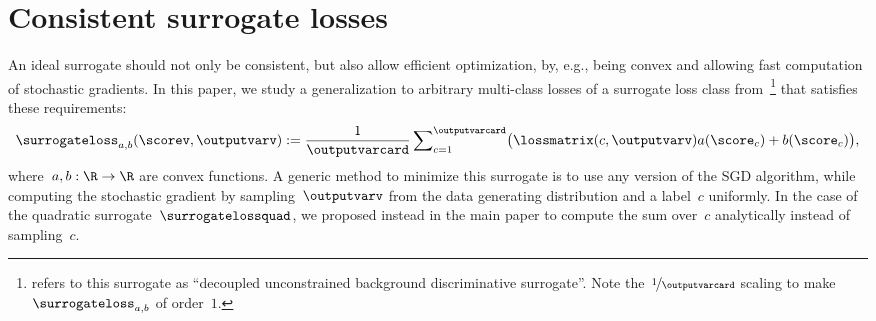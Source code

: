 \documentclass{article}
\begin{document}
\section{Consistent surrogate losses}
\label{sec:specialLosses}
An ideal surrogate should not only be consistent, but also allow efficient optimization, by, e.g., being convex and allowing fast computation of stochastic gradients.
In this paper, we study a generalization to arbitrary multi-class losses of a surrogate loss class from~\citet[Section~4.4.2]{zhang04}\footnote{\citet{zhang04} refers to this surrogate as ``decoupled unconstrained background discriminative surrogate''. Note the~$\nicefrac{1}{\outputvarcard}$ scaling to make $\surrogateloss_{a,b}$ of order~$1$.}
that satisfies these requirements:
\begin{equation}
\label{eq:abLoss}
\surrogateloss_{a,b}( \scorev, \outputvarv  )
:=
\frac{1}{\outputvarcard}\sum\nolimits_{c = 1}^\outputvarcard \bigl( \lossmatrix(c, \outputvarv) a( \score_c ) + b( \score_c ) \bigr),
\end{equation}
where~$a, b : \R \to \R$ are convex functions.
A generic method to minimize this surrogate is to use any version of the SGD algorithm, while computing the stochastic gradient by sampling~$\outputvarv$ from the data generating distribution and a label~$c$ uniformly.
In the case of the quadratic surrogate~$\surrogatelossquad$, we proposed instead in the main paper to compute the sum over~$c$ analytically instead of sampling~$c$.
\end{document}
